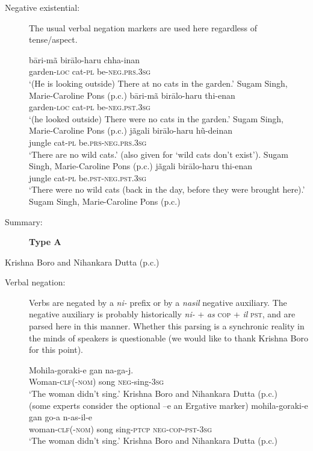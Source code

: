 \documentclass[output=paper,colorlinks,citecolor=brown]{langscibook}
\begin{document}
\begin{paperappendix}
\begin{unindented}
\begin{description}
\item[Negative existential:] The usual verbal negation markers are used here regardless of tense/aspect.
%
\begin{exe}\ex \gll bāri-mã birālo-haru  chha-inan \\
garden-\textsc{loc} cat-\textsc{pl} be-\textsc{neg.prs.3sg} \\
    \glt `(He is looking outside) There at no cats in the garden.' Sugam Singh, Marie-Caroline Pons (p.c.)
\ex \gll bāri-mã birālo-haru  thi-enan \\
garden-\textsc{loc} cat-\textsc{pl} be-\textsc{neg.pst.3sg} \\
    \glt `(he looked outside) There were no cats in the garden.' Sugam Singh, Marie-Caroline Pons (p.c.)
\ex \gll jãgali birālo-haru hũ-deinan \\
jungle cat-\textsc{pl} be.\textsc{prs-neg.prs.3sg} \\
    \glt `There are no wild cats.' (also given for `wild cats don't exist’). Sugam Singh, Marie-Caroline Pons (p.c.)
\ex \gll jãgali birālo-haru thi-enan \\
jungle cat-\textsc{pl} be.\textsc{pst-neg.pst.3sg} \\
    \glt `There were no wild cats (back in the day, before they were brought here).' Sugam Singh, Marie-Caroline Pons (p.c.)
    \end{exe} 

\item[Summary:] \textbf{Type A}
\end{description}

 Krishna Boro and Nihankara Dutta (p.c.)
\begin{description}
\item[Verbal negation:] Verbs are negated by a \textit{ni-} prefix or by a
\textit{nasil} negative auxiliary. The negative auxiliary is probably
historically \textit{ni-} + \textit{as} \textsc{cop} + \textit{il}
\textsc{pst}, and are parsed here in this manner. Whether this parsing is a synchronic reality in the minds of speakers is questionable (we would like to thank Krishna Boro for this point).

\begin{exe}\ex \gll Mohila-goraki{\op}-e{\cp} gan na-ga-j. \\
Woman-\textsc{clf(-nom)}  song \textsc{neg}-sing-\textsc{3sg} \\
    \glt `The woman didn't sing.' Krishna Boro and Nihankara Dutta (p.c.)
\\
(some experts consider the optional –e an Ergative marker)
\ex \gll mohila-goraki{\op}-e{\cp} gan  go-a n-as-il-e \\
woman-\textsc{clf}(-\textsc{nom}) song sing-\textsc{ptcp} \textsc{neg-cop-pst-3sg} \\
    \glt `The woman didn't sing.' Krishna Boro and Nihankara Dutta (p.c.)
    \end{exe}


\end{description}
\end{unindented}
\end{paperappendix}
\end{document}
